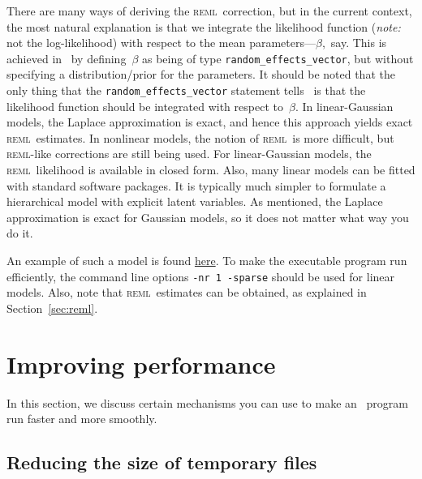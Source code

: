\documentclass{admbmanual}
\newcommand{\scREML}{\textsc{reml}}
\begin{document}
There are many ways of deriving the \scREML\ correction, but in the current context, the most natural explanation is that
we integrate the likelihood function (\textit{note:} not the log-likelihood) with respect to the mean parameters---$\beta$,~say. This is
achieved in \scAR\ by defining~$\beta$ as being of type \texttt{random\_effects\_vector}, but without
specifying a distribution/prior for the parameters. It should be noted that the only thing that
the \texttt{random\_effects\_vector} statement tells \scAR\ is that the likelihood function should be integrated with respect
to~$\beta$. In linear-Gaussian models, the Laplace approximation is exact, and hence this approach yields exact
\scREML\ estimates. In nonlinear models, the notion of \scREML\ is more difficult, but \scREML-like corrections are still being used.
For linear-Gaussian models, the \scREML\ likelihood is available in closed form. Also, many linear models can
be fitted with standard software packages. It is typically much simpler
to formulate a hierarchical model with explicit latent variables. 
As mentioned, the Laplace approximation is exact for Gaussian models, so it does not matter
what way you do it.

An example of such a model is found 
\href{http://otter-rsch.com/admbre/examples/bcb/bcb.html}{here}.
To make the executable program run efficiently, the command line
options \texttt{-nr 1 -sparse}  should be used for linear models.
Also, note that \scREML\ estimates can be obtained, as explained in Section~\ref{sec:reml}.


\section{Improving performance}
\label{sec:improving}

In this section, we discuss certain mechanisms you can use to make an \scAR\
program run faster and more smoothly.


\subsection{Reducing the size of temporary files}
\label{Memory_management}
\end{document}
